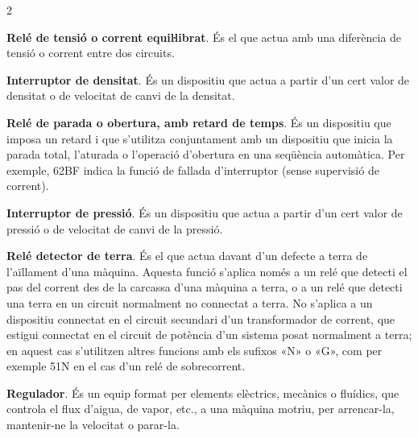 \begin{multicols}{2}
\begin{list}{}
		\item[\textbf{60}]   
		\textbf{Relé de tensió o corrent equiŀlibrat}. És el que actua amb una diferència de tensió o
		corrent entre dos circuits.
		
		\item[\textbf{61}] 
		\textbf{Interruptor de densitat}. És un dispositiu que actua a partir d'un cert valor de densitat o de velocitat de canvi de la densitat.
		
		
		\item[\textbf{62}]   
		\textbf{Relé de parada o obertura, amb retard de temps}. És un dispositiu que imposa un retard i que s'utilitza
		conjuntament amb un dispositiu que inicia la parada total, l'aturada o l'operació
		d'obertura en una seqüència automàtica. Per exemple, 62BF indica la funció de fallada d'interruptor (sense supervisió de corrent).
		
		\item[\textbf{63}]   
		\textbf{Interruptor de pressió}. És un dispositiu que actua a partir d'un cert valor de pressió o de velocitat de canvi de la pressió.
		
		\item[\textbf{64}]    
		\textbf{Relé detector de terra}.
		És el que actua davant d'un defecte a terra de l'aïllament d'una
		màquina. Aquesta funció s'aplica només a un relé que detecti el pas
		del corrent des de la carcassa  d'una màquina a terra, o a un relé
		que detecti una terra en un circuit normalment no connectat a terra. No
		s'aplica a un dispositiu connectat en el circuit secundari d'un
		transformador de corrent, que estigui connectat en el circuit de
		potència d'un sistema posat normalment a terra; en aquest cas s'utilitzen altres funcions amb els sufixos «N» o «G», com  per exemple 51N en el cas d'un relé de sobrecorrent.
		
		\item[\textbf{65}]   
		\textbf{Regulador}. És un equip format per elements
		elèctrics, mecànics o fluídics,  que controla el flux d'aigua, de
		vapor, etc.,  a una màquina motriu, per arrencar-la, mantenir-ne
		la  velocitat o parar-la.
		

\end{list}
\end{multicols}
